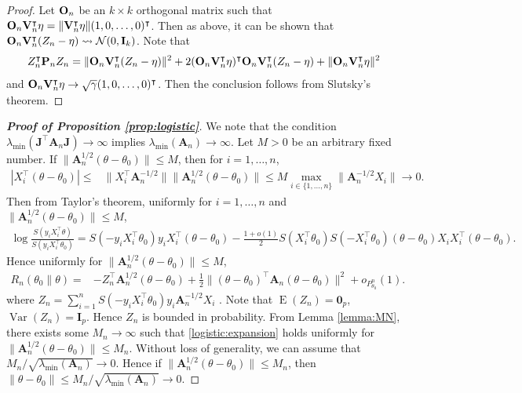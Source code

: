 \documentclass[11pt]{article}
\DeclareMathOperator{\myE}{E}
\DeclareMathOperator{\myVar}{Var}
\newcommand{\BA}{\mathbf{A}}    \newcommand{\BB}{\mathbf{B}}    \newcommand{\BC}{\mathbf{C}}    \newcommand{\BD}{\mathbf{D}}    \newcommand{\BE}{\mathbf{E}}    \newcommand{\BF}{\mathbf{F}}    \newcommand{\BG}{\mathbf{G}}    \newcommand{\BH}{\mathbf{H}}    \newcommand{\BI}{\mathbf{I}}    \newcommand{\BJ}{\mathbf{J}}    \newcommand{\BK}{\mathbf{K}}    \newcommand{\BL}{\mathbf{L}}
\newcommand{\myT}{\intercal}
\theoremstyle{plain}
\theoremstyle{definition}
\theoremstyle{remark}
\begin{document}
\begin{appendices}
\begin{proof}
    Let $\mathbf{O}_n$ be an $k \times k$ orthogonal matrix such that $ \BO_n \BV_n^\myT \eta = \|\BV_n^\myT \eta\| (1, 0,\dots, 0)^\myT $.
    Then as above, it can be shown that
$
    \BO_n \BV_n^\myT (Z_n-\eta)
    \rightsquigarrow 
    \mathcal N(0, \BI_{k})
    $.
    Note that
    \begin{align*}
        Z_n^\myT \BP_n Z_n 
        =
 \| \BO_n \BV_n^\myT (Z_n - \eta)\|^2
 +2   (\BO_n \BV_n^\myT \eta )^\myT  \BO_n \BV_n^\myT (Z_n -\eta)
+\|\BO_n \BV_n^\myT \eta\|^2
    \end{align*}
    and
    $
    \BO_n \BV_n^\myT \eta \to \sqrt \gamma (1,0,\dots, 0)^\myT
    $.
    Then the conclusion follows from Slutsky's theorem.
\end{proof}

\begin{proof}[\textbf{Proof of Proposition \ref{prop:logistic}}]
We note that the condition $\lambda_{\min}(\BJ^\myT \BA_n \BJ) \to \infty$ implies $\lambda_{\min}(\BA_n) \to \infty$.
Let $M>0$ be an arbitrary fixed number.
If $\|\BA_n^{1/2}(\theta - \theta_0)\| \leq M$, then for $i = 1, \dots, n$,
\begin{align*}
|X_i^\myT (\theta - \theta_0)| 
\leq& \|X_i^\myT  \BA_n^{-1/2} \|  \| \BA_n^{1/2} (\theta - \theta_0) \|
\leq 
M
\max_{i\in \{1,\dots, n\}}\| \BA_n^{-1/2} X_i \|
\to 0
.
\end{align*}
Then from Taylor's theorem, uniformly for $i=1,\dots,n$ and $ \|\BA_n^{1/2}(\theta - \theta_0)\| \leq M$,
\begin{align*}
    \log \frac{S(y_i X_i^\myT \theta)}{S(y_i X_i^\myT \theta_0)}
    = S(-y_i X_i^\myT \theta_0)  y_i X_i^\myT (\theta - \theta_0)
    -\frac{1 + o(1)}{2} 
    S( X_i^\myT \theta_0)
    S(- X_i^\myT \theta_0)
(\theta - \theta_0)
X_i
X_i^\myT (\theta - \theta_0)
.
\end{align*}
Hence uniformly for $\|\BA_n^{1/2}(\theta - \theta_0)\| \leq M$,
\begin{align}\label{logistic:expansion}
    R_n(\theta_0 \| \theta)
=&
-Z_n^{\myT} \BA_n^{1/2}(\theta - \theta_0)
    +\frac{1 }{2} 
    \|
(\theta - \theta_0)^\myT
\BA_n (\theta - \theta_0)
    \|^2
    +o_{P_{\theta_0}^n}(1)
.
\end{align}
where
$
 Z_n = 
    \sum_{i=1}^n 
 S(-y_i X_i^\myT \theta_0) 
  y_i
 \BA_n^{-1/2}
 X_i
 $
 .
Note that $\myE (Z_n) = \mathbf 0_p$, $\myVar (Z_n) = \BI_p$.
Hence $Z_n$ is bounded in probability.
From Lemma \ref{lemma:MN}, there exists some $M_n \to \infty$ such that \eqref{logistic:expansion} holds uniformly for $\|\BA_n^{1/2}(\theta - \theta_0)\| \leq M_n$.
Without loss of generality, we can assume that $M_n / \sqrt{\lambda_{\min}(\BA_n)} \to 0$.
Hence if $\|\BA_n^{1/2}(\theta - \theta_0)\| \leq M_n$, then $\|\theta - \theta_0\| \leq M_n / \sqrt{\lambda_{\min}(\BA_n)} \to 0$.


\end{proof}
\end{appendices}
\end{document}
